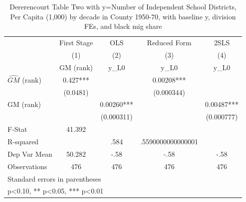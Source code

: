 \begin{table}[htbp]\centering
\def\sym#1{\ifmmode^{#1}\else\(^{#1}\)\fi}
\caption{Dererencourt Table Two with y=Number of Independent School Districts, Per Capita (1,000) by decade in County 1950-70, with baseline y, division FEs, and black mig share}
\begin{tabular}{l*{4}{c}}
\toprule
                    & First Stage   &         OLS   &Reduced Form   &        2SLS   \\
                    &\multicolumn{1}{c}{(1)}&\multicolumn{1}{c}{(2)}&\multicolumn{1}{c}{(3)}&\multicolumn{1}{c}{(4)}\\
                    &\multicolumn{1}{c}{GM  (rank)}&\multicolumn{1}{c}{y\_L0}&\multicolumn{1}{c}{y\_L0}&\multicolumn{1}{c}{y\_L0}\\
\midrule
$\hat{GM}$ (rank)   &       0.427***&               &     0.00208***&               \\
                    &    (0.0481)   &               &  (0.000344)   &               \\
\addlinespace
GM  (rank)          &               &     0.00260***&               &     0.00487***\\
                    &               &  (0.000311)   &               &  (0.000777)   \\
\midrule
F-Stat              &      41.392   &               &               &               \\
R-squared           &               &        .584   &.5590000000000001   &               \\
Dep Var Mean        &      50.282   &        -.58   &        -.58   &        -.58   \\
Observations        &         476   &         476   &         476   &         476   \\
\bottomrule
\multicolumn{5}{l}{\footnotesize Standard errors in parentheses}\\
\multicolumn{5}{l}{\footnotesize * p<0.10, ** p<0.05, *** p<0.01}\\
\end{tabular}
\end{table}
